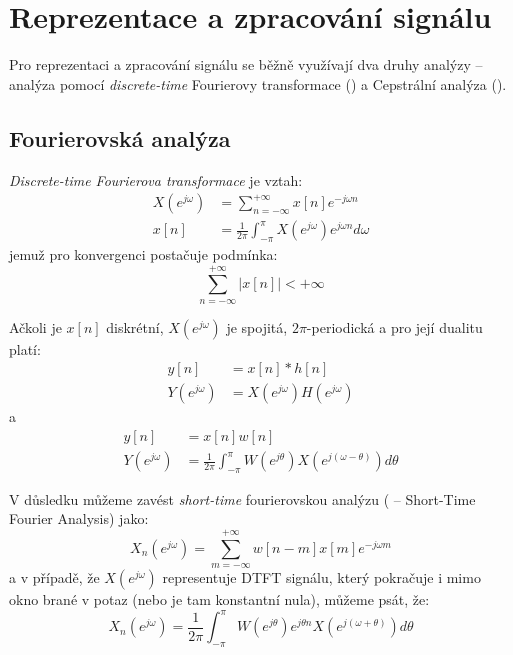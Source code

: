 \section{Reprezentace a zpracování signálu}

Pro reprezentaci a zpracování signálu se běžně využívají dva druhy analýzy -- analýza pomocí {\sl discrete-time} Fourierovy transformace () a Cepstrální analýza ().

\subsection{Fourierovská analýza}

{\sl {\sl Discrete-time} Fourierova transformace} je vztah:
\begin{align}
	\label{eq:dtft}
	X(e^{j\omega}) &= \sum\limits_{n=-\infty}^{+\infty} x[n] e^{-j\omega n}\\
	          x[n] &= \frac{1}{2\pi} \int_{-\pi}^{\pi} X(e^{j\omega})e^{j\omega n} d\omega
\end{align}
jemuž pro konvergenci postačuje podmínka:
\begin{equation}
	\label{eq:dtft_conv}
	\sum\limits_{n=-\infty}^{+\infty} |x[n]| < +\infty
\end{equation} 

Ačkoli je $x[n]$ diskrétní, $X(e^{j\omega})$ je spojitá, $2\pi$-periodická a pro její dualitu platí:
%
\begin{align}
	\label{eq:dtft_d}
	          y[n] &= x[n] * h[n]\\
	Y(e^{j\omega}) &= X(e^{j\omega})H(e^{j\omega})
\end{align}
%
a
%
\begin{align}
	          y[n] &= x[n]w[n]\\
	Y(e^{j\omega}) &= \frac{1}{2\pi} \int_{-\pi}^{\pi} W(e^{j\theta})X(e^{j(\omega - \theta)})d\theta
\end{align}

V důsledku můžeme zavést {\sl short-time} fourierovskou analýzu ( -- Short-Time Fourier Analysis) jako:
%
\begin{equation}
	\label{eq:stfa}
	X_n(e^{j\omega}) = \sum\limits_{m=-\infty}^{+\infty} w[n-m]x[m]e^{-j\omega m}
\end{equation}
%
a v případě, že $X(e^{j\omega})$ representuje DTFT signálu, který pokračuje i mimo okno brané v potaz (nebo je tam konstantní nula), můžeme psát, že:
%
\begin{equation}
	\label{eq:stfa_f}
	X_n(e^{j\omega}) = \frac{1}{2\pi} \int_{-\pi}^{\pi} W(e^{j\theta})e^{j\theta n}X(e^{j(\omega + \theta)})d\theta
\end{equation}

